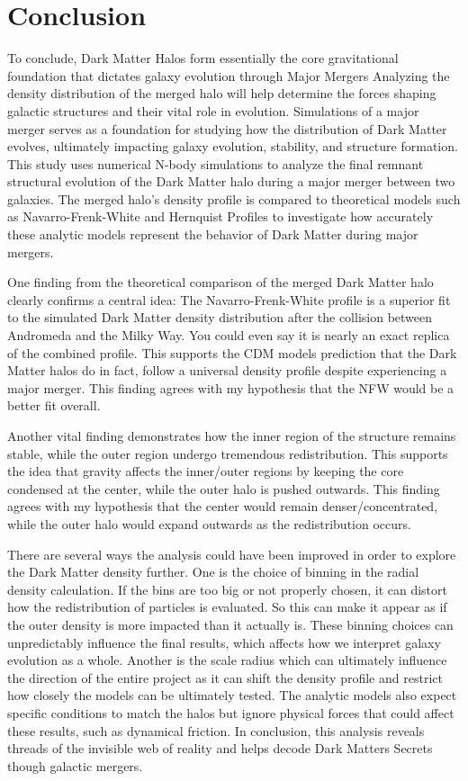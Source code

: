 \documentclass[fleqn,usenatbib]{mnras}
\begin{document}
\section{Conclusion}
To conclude, Dark Matter Halos form essentially the core gravitational foundation that dictates galaxy evolution through Major Mergers \citep{2019MNRAS.487..993D} Analyzing the density distribution of the merged halo will help determine the forces shaping galactic structures and their vital role in evolution. Simulations of a major merger serves as a foundation for studying how the distribution of Dark Matter evolves, ultimately impacting galaxy evolution, stability, and structure formation. This study uses numerical N-body simulations to analyze the final remnant structural evolution of the Dark Matter halo during a major merger between two galaxies. The merged halo's density profile is compared to theoretical models such as Navarro-Frenk-White and Hernquist Profiles to investigate how accurately these analytic models represent the behavior of Dark Matter during major mergers. 

One finding from the theoretical comparison of the merged Dark Matter halo clearly confirms a central idea: The Navarro-Frenk-White profile is a superior fit to the simulated Dark Matter density distribution after the collision between Andromeda and the Milky Way. You could even say it is nearly an exact replica of the combined profile. This supports the CDM models prediction that the Dark Matter halos do in fact, follow a universal density profile despite experiencing a major merger. This finding agrees with my hypothesis that the NFW would be a better fit overall. 

Another vital finding demonstrates how the inner region of the structure remains stable, while the outer region undergo tremendous redistribution. This supports the idea that gravity affects the inner/outer regions by keeping the core condensed at the center, while the outer halo is pushed outwards. This finding agrees with my hypothesis that the center would remain denser/concentrated, while the outer halo would expand outwards as the redistribution occurs.

There are several ways the analysis could have been improved in order to explore the Dark Matter density further. One is the choice of binning in the radial density calculation. If the bins are too big or not properly chosen, it can distort how the redistribution of particles is evaluated. So this can make it appear as if the outer density is more impacted than it actually is. These binning choices can unpredictably influence the final results, which affects how we interpret galaxy evolution as a whole. Another is the scale radius which can ultimately influence the direction of the entire project as it can shift the density profile and restrict how closely the models can be ultimately tested. The analytic models also expect specific conditions to match the halos but ignore physical forces that could affect these results, such as dynamical friction. In conclusion, this analysis reveals threads of the invisible web of reality and helps decode Dark Matters Secrets though galactic mergers. 
\end{document}

